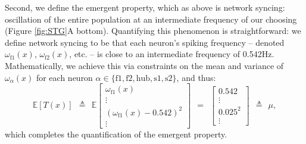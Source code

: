 \documentclass[11pt]{article}
\begin{document}
Second, we define the emergent property, which as above is network syncing: oscillation of the entire population at an intermediate frequency of our choosing (Figure \ref{fig:STG}A bottom).
Quantifying this phenomenon is straightforward: we define network syncing to be that each neuron's spiking frequency -- denoted $\omega_{\text{f1}}(x)$, $\omega_{\text{f2}}(x)$, etc. -- is close to an intermediate frequency of 0.542Hz.  
Mathematically, we achieve this via constraints on the mean and variance of $\omega_\alpha(x)$ for each neuron $\alpha \in \{ \text{f1}, \text{f2}, \text{hub}, \text{s1}, \text{s2} \}$, and thus:
\begin{equation}\label{eq:EP}
 \mathbb{E}\left[T(x) \right] ~~\triangleq~~ \mathbb{E}\begin{bmatrix} \omega_{\text{f1}}(x) \\ \vdots \\ (\omega_{\text{f1}}(x) - 0.542)^2 \\ \vdots \end{bmatrix} ~~=~~  
 \begin{bmatrix} 0.542 \\ \vdots \\ 0.025^2 \\ \vdots \end{bmatrix} ~~\triangleq~~ \mu,
 \end{equation}
  which completes the quantification of the emergent property.
\end{document}
